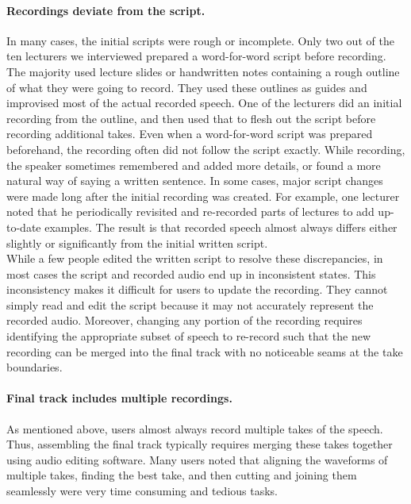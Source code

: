 \paragraph{Recordings deviate from the script.} In many cases, the initial scripts were rough or incomplete. Only two out of the ten lecturers we interviewed prepared a word-for-word script before recording. The majority used lecture slides or handwritten notes containing a rough outline of what they were going to record. They used these outlines as guides and improvised most of the actual recorded speech. One of the lecturers did an initial recording from the outline, and then used that to flesh out the script before recording additional takes. Even when a word-for-word script was prepared beforehand, the recording often did not follow the script exactly. While recording, the speaker sometimes remembered and added more details, or found a more natural way of saying a written sentence. In some cases, major script changes were made long after the initial recording was created. For example, one lecturer noted that he periodically revisited and re-recorded parts of lectures to add up-to-date examples. The result is that recorded speech almost always differs either slightly or significantly from the initial written script. \\
While a few people edited the written script to resolve these discrepancies, in most cases the script and recorded audio end up in inconsistent states. This inconsistency makes it difficult for users to update the recording. They cannot simply read and edit the script because it may not accurately represent the recorded audio. Moreover,  changing any portion of the recording requires identifying the appropriate subset of speech to re-record such that the new recording can be merged into the final track with no noticeable seams at the take boundaries.  

\paragraph{Final track includes multiple recordings.} As mentioned above, users almost always record multiple takes of the speech. Thus, assembling the final track typically requires merging these takes together using audio editing software. Many users noted that aligning the waveforms of multiple takes, finding the best take, and then cutting and joining them seamlessly were very time consuming and tedious tasks.

